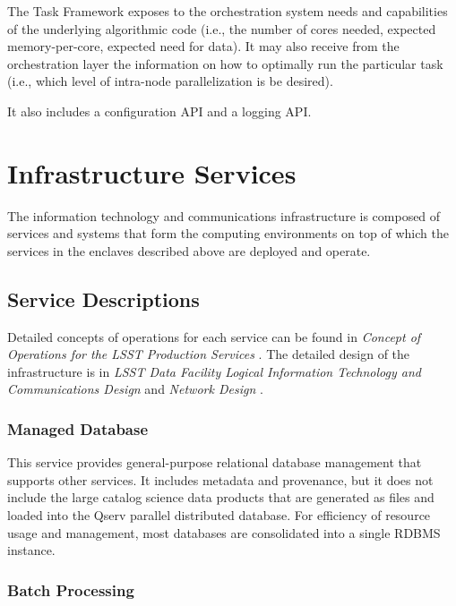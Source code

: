 \documentclass[DM,toc,lsstdraft]{lsstdoc}
\begin{document}
The Task Framework exposes to the orchestration system needs and
capabilities of the underlying algorithmic code (i.e., the number of
cores needed, expected memory-per-core, expected need for data). It may
also receive from the orchestration layer the information on how to
optimally run the particular task (i.e., which level of intra-node
parallelization is be desired).

It also includes a configuration API and a logging API.


\section{Infrastructure Services}\label{infrastructure-services}

The information technology and communications infrastructure is composed of services and systems that form the computing environments on top of which the services in the enclaves described above are deployed and operate.

\subsection{Service Descriptions}\label{infrastructure-service-descriptions}

Detailed concepts of operations for each service can be found in \textit{Concept of Operations for the LSST Production Services} .
The detailed design of the infrastructure is in \textit{LSST Data Facility Logical Information Technology and Communications Design}  and \textit{Network Design} .

\subsubsection{Managed Database}\label{managed-database}

This service provides general-purpose relational database management that supports other services.
It includes metadata and provenance, but it does not include the large catalog science data products that are generated as files and loaded into the Qserv parallel distributed database.
For efficiency of resource usage and management, most databases are consolidated into a single RDBMS instance.

\subsubsection{Batch Processing}\label{batch-processing}
\end{document}
